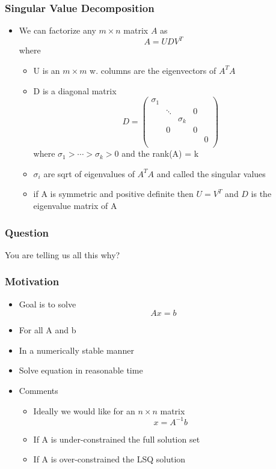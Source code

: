 \documentclass[10pt]{beamer}
\begin{document}
\begin{frame}
  \frametitle{Singular Value Decomposition}
  \begin{itemize}
  \item We can factorize any $m \times n$ matrix $A$ as
    \[
      A = UDV^T
    \]
    where
    \begin{itemize}
    \item U is an $m \times m$ w. columns are the eigenvectors of $A^T A$ 
    \item D is a diagonal matrix
      \[
        D = \left(
          \begin{array}{ccccc}
            \sigma_1 & & & & \\
                     & \ddots & & 0 &\\
                     &   & \sigma_k & &\\
                   & 0   &          & 0 \\
                    & & & & 0 \\
          \end{array} \right)
      \]
      where $ \sigma_1 > \cdots > \sigma_k > 0 $ and the rank(A) = k
    \item $\sigma_i$ are sqrt of eigenvalues of $A^T A$ and called the singular values
    \item if A is symmetric and positive definite then $U = V^T$ and $D$ is the eigenvalue
      matrix of A
    \end{itemize}
  \end{itemize}
\end{frame}

\begin{frame}
  \frametitle{Question}
  \centerline{\Huge You are telling us all this why?}
\end{frame}

\begin{frame}
  \frametitle{Motivation}
  \begin{itemize}
  \item Goal is to solve
    \[ A x = b
    \]
  \item For all A and b
  \item In a numerically stable manner
  \item Solve equation in reasonable time
  \item Comments
    \begin{itemize}
    \item Ideally we would like for an $n \times n$ matrix
      \[ x = A^{-1} b \]      
    \item If A is under-constrained the full solution set
    \item If A is over-constrained the LSQ solution
    \end{itemize}
  \end{itemize}
\end{frame}
\end{document}
